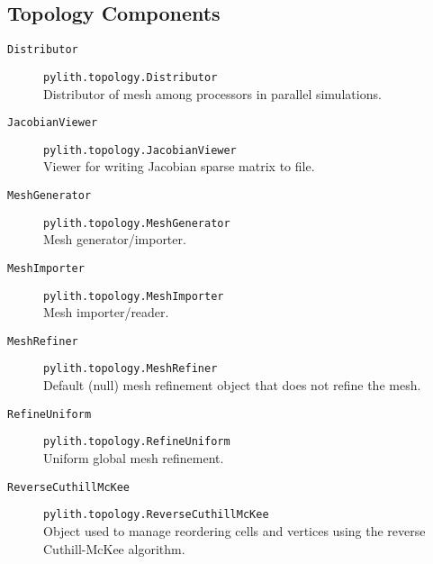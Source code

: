 \subsection{Topology Components}
\begin{description}
\item [{\texttt{Distributor}}] \texttt{pylith.topology.Distributor}\\
Distributor of mesh among processors in parallel simulations.
\item [{\texttt{JacobianViewer}}] \texttt{pylith.topology.JacobianViewer}\\
Viewer for writing Jacobian sparse matrix to file.
\item [{\texttt{MeshGenerator}}] \texttt{pylith.topology.MeshGenerator}\\
Mesh generator/importer.
\item [{\texttt{MeshImporter}}] \texttt{pylith.topology.MeshImporter}\\
Mesh importer/reader.
\item [{\texttt{MeshRefiner}}] \texttt{pylith.topology.MeshRefiner}\\
Default (null) mesh refinement object that does not refine the mesh.
\item [{\texttt{RefineUniform}}] \texttt{pylith.topology.RefineUniform}\\
Uniform global mesh refinement.
\item [{\texttt{ReverseCuthillMcKee}}] \texttt{pylith.topology.ReverseCuthillMcKee}\\
Object used to manage reordering cells and vertices using the reverse
Cuthill-McKee algorithm.
\end{description}

